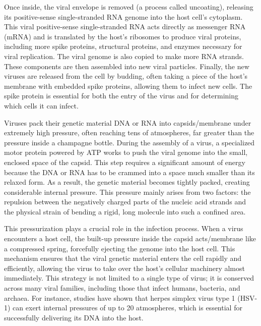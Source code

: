 \documentclass[12pt]{article}
\begin{document}
\begin{flushleft}
Once inside, the viral envelope is removed (a process called uncoating), releasing its positive-sense single-stranded RNA genome into the host cell’s cytoplasm. This viral positive-sense single-stranded RNA acts directly as messenger RNA (mRNA) and is translated by the host's ribosomes to produce viral proteins, including more spike proteins, structural proteins, and enzymes necessary for viral replication. The viral genome is also copied to make more RNA strands. These components are then assembled into new viral particles. Finally, the new viruses are released from the cell by budding, often taking a piece of the host’s membrane with embedded spike proteins, allowing them to infect new cells. The spike protein is essential for both the entry of the virus and for determining which cells it can infect.

Viruses pack their genetic material DNA or RNA into capsids/membrane under extremely high pressure, often reaching tens of atmospheres, far greater than the pressure inside a champagne bottle. During the assembly of a virus, a specialized motor protein powered by ATP works to push the viral genome into the small, enclosed space of the capsid. This step requires a significant amount of energy because the DNA or RNA has to be crammed into a space much smaller than its relaxed form. As a result, the genetic material becomes tightly packed, creating considerable internal pressure. This pressure mainly arises from two factors: the repulsion between the negatively charged parts of the nucleic acid strands and the physical strain of bending a rigid, long molecule into such a confined area.\cite{BrandarizNunez2019}




This pressurization plays a crucial role in the infection process. When a virus encounters a host cell, the built-up pressure inside the capsid acts/membrane like a compressed spring, forcefully ejecting the genome into the host cell. This mechanism ensures that the viral genetic material enters the cell rapidly and efficiently, allowing the virus to take over the host’s cellular machinery almost immediately. This strategy is not limited to a single type of virus; it is conserved across many viral families, including those that infect humans, bacteria, and archaea. For instance, studies have shown that herpes simplex virus type 1 (HSV-1) can exert internal pressures of up to 20 atmospheres, which is essential for successfully delivering its DNA into the host\cite{BrandarizNunez2019}.\\


\end{flushleft}
\end{document}
